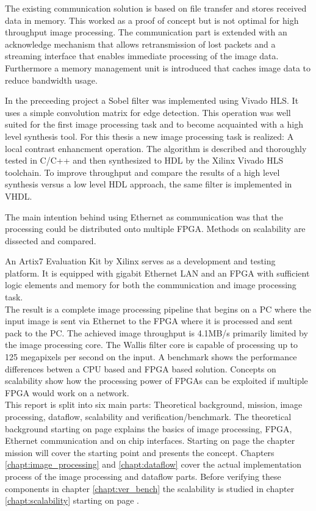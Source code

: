 The existing communication solution is based on file transfer and stores
received data in memory. This worked as a proof of concept but is not optimal
for high throughput image processing. The communication part is extended with an
acknowledge mechanism that allows retransmission of lost packets and a streaming
interface that enables immediate processing of the image data. Furthermore a
memory management unit is introduced that caches image data to reduce bandwidth
usage.

In the preceeding project a Sobel filter was implemented using Vivado HLS. It
uses a simple convolution matrix for edge detection. This operation was well
suited for the first image processing task and to become acquainted with a high
level synthesis tool. For this thesis a new image processing task is realized: A
local contrast enhancment operation. The algorithm is described and thoroughly
tested in C/C++ and then synthesized to HDL by the Xilinx Vivado HLS toolchain.
To improve throughput and compare the results of a high level synthesis versus a
low level HDL approach, the same filter is implemented in VHDL.

The main intention behind using Ethernet as communication was that the
processing could be distributed onto multiple FPGA. Methods on scalability are
dissected and compared.

An Artix7 Evaluation Kit by Xilinx serves as a development and testing platform.
It is equipped with gigabit Ethernet LAN and an FPGA with sufficient logic
elements and memory for both the communication and image processing task.
\\

The result is a complete image processing pipeline that begins on a PC where the
input image is sent via Ethernet to the FPGA where it is processed and sent pack
to the PC. The achieved image throughput is 4.1MB/s primarily limited by the image processing core. The Wallis filter core
is capable of processing up to 125 megapixels per second on the input. A benchmark shows the performance differences betwen a CPU based and FPGA based solution. Concepts on
scalability show how the processing power of FPGAs can be exploited if multiple
FPGA would work on a network.
\\

This report is split into six main parts: Theoretical background, mission,
image processing, dataflow, scalability and verification/benchmark.  The
theoretical background starting on page \pageref{chapt:theoreticalback} explains
the basics of image processing, FPGA, Ethernet communication and on chip
interfaces. Starting on page \pageref{chapt:mission} the chapter mission will
cover the starting point and presents the concept. Chapters 
\ref{chapt:image_processing} and \ref{chapt:dataflow} cover the actual
implementation process of the image processing and dataflow parts.
Before verifying these components in chapter \ref{chapt:ver_bench} the
scalability is studied in chapter \ref{chapt:scalability} starting on page
\pageref{chapt:scalability}.

